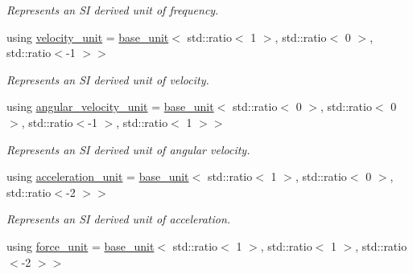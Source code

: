 \begin{DoxyCompactItemize}
\begin{DoxyCompactList}\small\item\em Represents an S\+I derived unit of frequency. \end{DoxyCompactList}\item 
\hypertarget{namespaceunits_1_1category_a47c81b9d092be905b13720353ac1d994}{}using \hyperlink{namespaceunits_1_1category_a47c81b9d092be905b13720353ac1d994}{velocity\+\_\+unit} = \hyperlink{structunits_1_1base__unit}{base\+\_\+unit}$<$ std\+::ratio$<$ 1 $>$, std\+::ratio$<$ 0 $>$, std\+::ratio$<$-\/1 $>$$>$\label{namespaceunits_1_1category_a47c81b9d092be905b13720353ac1d994}

\begin{DoxyCompactList}\small\item\em Represents an S\+I derived unit of velocity. \end{DoxyCompactList}\item 
\hypertarget{namespaceunits_1_1category_acb7b5604c20499976d9eeb13d2871536}{}using \hyperlink{namespaceunits_1_1category_acb7b5604c20499976d9eeb13d2871536}{angular\+\_\+velocity\+\_\+unit} = \hyperlink{structunits_1_1base__unit}{base\+\_\+unit}$<$ std\+::ratio$<$ 0 $>$, std\+::ratio$<$ 0 $>$, std\+::ratio$<$-\/1 $>$, std\+::ratio$<$ 1 $>$$>$\label{namespaceunits_1_1category_acb7b5604c20499976d9eeb13d2871536}

\begin{DoxyCompactList}\small\item\em Represents an S\+I derived unit of angular velocity. \end{DoxyCompactList}\item 
\hypertarget{namespaceunits_1_1category_a176b75b1e0ac2ee900d9c21704cd041e}{}using \hyperlink{namespaceunits_1_1category_a176b75b1e0ac2ee900d9c21704cd041e}{acceleration\+\_\+unit} = \hyperlink{structunits_1_1base__unit}{base\+\_\+unit}$<$ std\+::ratio$<$ 1 $>$, std\+::ratio$<$ 0 $>$, std\+::ratio$<$-\/2 $>$$>$\label{namespaceunits_1_1category_a176b75b1e0ac2ee900d9c21704cd041e}

\begin{DoxyCompactList}\small\item\em Represents an S\+I derived unit of acceleration. \end{DoxyCompactList}\item 
\hypertarget{namespaceunits_1_1category_aac6f93abf7809deaddcec0f6edec7cc3}{}using \hyperlink{namespaceunits_1_1category_aac6f93abf7809deaddcec0f6edec7cc3}{force\+\_\+unit} = \hyperlink{structunits_1_1base__unit}{base\+\_\+unit}$<$ std\+::ratio$<$ 1 $>$, std\+::ratio$<$ 1 $>$, std\+::ratio$<$-\/2 $>$$>$\label{namespaceunits_1_1category_aac6f93abf7809deaddcec0f6edec7cc3}


\end{DoxyCompactItemize}
